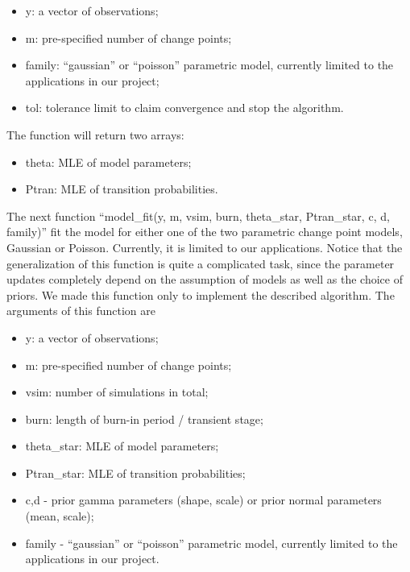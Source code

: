 \documentclass{article}
\begin{document}
\begin{itemize}
\itemsep1pt\parskip0pt
\item
  y: a vector of observations;
\item
  m: pre-specified number of change points;
\item
  family: ``gaussian'' or ``poisson'' parametric model, currently
  limited to the applications in our project;
\item
  tol: tolerance limit to claim convergence and stop the algorithm.
\end{itemize}

The function will return two arrays:

\begin{itemize}
\itemsep1pt\parskip0pt
\item
  theta: MLE of model parameters;
\item
  Ptran: MLE of transition probabilities.
\end{itemize}

The next function ``model\_fit(y, m, vsim, burn, theta\_star,
Ptran\_star, c, d, family)'' fit the model for either one of the two
parametric change point models, Gaussian or Poisson. Currently, it is
limited to our applications. Notice that the generalization of this
function is quite a complicated task, since the parameter updates
completely depend on the assumption of models as well as the choice of
priors. We made this function only to implement the described algorithm.
The arguments of this function are

\begin{itemize}
\itemsep1pt\parskip0pt
\item
  y: a vector of observations;
\item
  m: pre-specified number of change points;
\item
  vsim: number of simulations in total;
\item
  burn: length of burn-in period / transient stage;
\item
  theta\_star: MLE of model parameters;
\item
  Ptran\_star: MLE of transition probabilities;
\item
  c,d - prior gamma parameters (shape, scale) or prior normal parameters
  (mean, scale);
\item
  family - ``gaussian'' or ``poisson'' parametric model, currently
  limited to the applications in our project.
\end{itemize}
\end{document}
